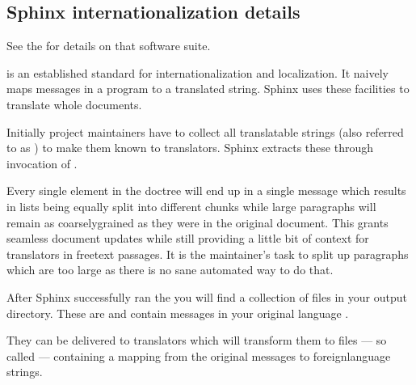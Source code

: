 \documentclass[letterpaper,10pt,english]{sphinxmanual}
\begin{document}
\subsection{Sphinx internationalization details}
\label{\detokenize{usage/advanced/intl:sphinx-internationalization-details}}
\begin{footnote}[1]\sphinxAtStartFootnote
See the \sphinxfootnotemark[13]
for details on that software suite.
%
\end{footnote}%
\begin{footnotetext}[13]\sphinxAtStartFootnote
{}
%
\end{footnotetext}\ignorespaces  is an established standard for internationalization and
localization.  It naively maps messages in a program to a translated string.
Sphinx uses these facilities to translate whole documents.

Initially project maintainers have to collect all translatable strings (also
referred to as ) to make them known to translators.  Sphinx extracts
these through invocation of .

Every single element in the doctree will end up in a single message which
results in lists being equally split into different chunks while large
paragraphs will remain as coarsely\sphinxhyphen{}grained as they were in the original
document.  This grants seamless document updates while still providing a little
bit of context for translators in free\sphinxhyphen{}text passages.  It is the maintainer’s
task to split up paragraphs which are too large as there is no sane automated
way to do that.

After Sphinx successfully ran the
 you will find a
collection of  files in your output directory.  These are  and contain messages in your original language .

They can be delivered to translators which will transform them to  files
— so called  — containing a mapping from the original
messages to foreign\sphinxhyphen{}language strings.
\end{document}

